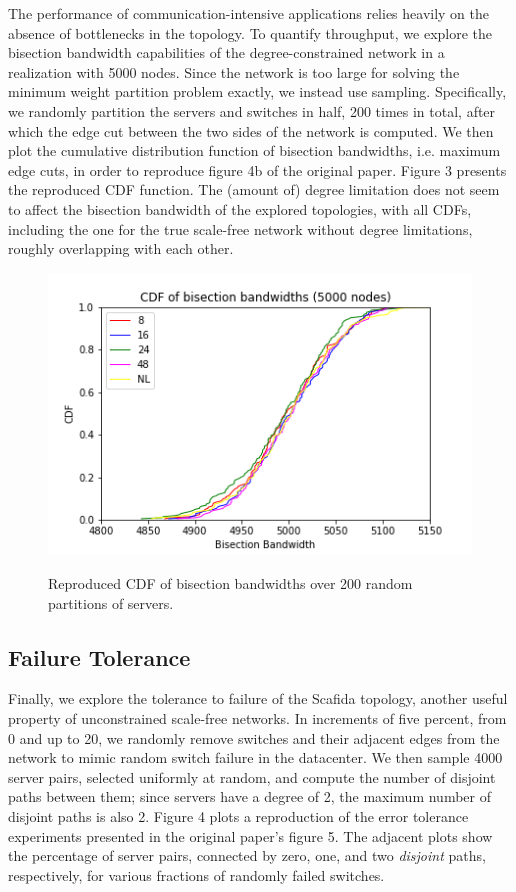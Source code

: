 The performance of communication-intensive applications relies heavily on the absence of bottlenecks in the topology. To quantify throughput, we explore the bisection bandwidth capabilities of the degree-constrained network in a realization with 5000 nodes. Since the network is too large for solving the minimum weight partition problem exactly, we instead use sampling. Specifically, we randomly partition the servers and switches in half, 200 times in total, after which the edge cut between the two sides of the network is computed. We then plot  the cumulative distribution function of bisection bandwidths, i.e. maximum edge cuts, in order to reproduce figure 4b of the original paper. Figure 3 presents the reproduced CDF function. The (amount of) degree limitation does not seem to affect the bisection bandwidth of the explored topologies, with all CDFs, including the one for the true scale-free network without degree limitations, roughly overlapping with each other.

\vspace{3pt}
\begin{figure}[h!]
\centering
   \includegraphics[width=1\linewidth]{figures/bisections}
   \label{fig:Ng2}

\caption{Reproduced CDF of bisection bandwidths over 200 random partitions of servers.}
\end{figure}

\subsection{Failure Tolerance}

Finally, we explore the tolerance to failure of the Scafida topology, another useful property of unconstrained scale-free networks. In increments of five percent, from 0 and up to 20, we randomly remove switches and their adjacent edges from the network to mimic random switch failure in the datacenter. We then sample 4000 server pairs, selected uniformly at random, and compute the number of disjoint paths between them; since servers have a degree of 2, the maximum number of disjoint paths is also 2. Figure 4 plots a reproduction of the error tolerance experiments presented in the original paper's figure 5. The adjacent plots show the percentage of server pairs, connected by zero, one, and two \textit{disjoint} paths, respectively, for various fractions of randomly failed switches.


